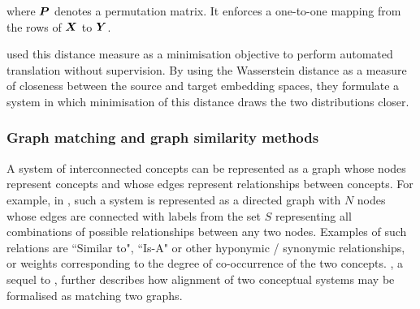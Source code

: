 where $\boldsymbol{P}$ denotes a permutation matrix. It enforces a one-to-one mapping from the rows of $\boldsymbol{X}$ to $\boldsymbol{Y}$.


\cite{Zhang2017EarthMD} used this distance measure as a minimisation objective to perform automated translation without supervision. By using the Wasserstein distance as a measure of closeness between the source and target embedding spaces, they formulate a system in which minimisation of this distance draws the two distributions closer. %




\subsubsection{Graph matching and graph similarity methods}

A system of interconnected concepts can be represented as a graph whose nodes represent concepts and whose edges represent relationships between concepts. For example, in \cite{Absurdist2}, such a system is represented as a directed graph with $N$ nodes whose edges are connected with labels from the set $S$ representing all combinations of possible relationships between any two nodes. Examples of such relations are ``Similar to", ``Is-A" or other hyponymic / synonymic relationships, or weights corresponding to the degree of co-occurrence of the two concepts. \cite{Absurdist2}, a sequel to \cite{GOLDSTONE2002295}, further describes how alignment of two conceptual systems may be formalised as matching two graphs.

